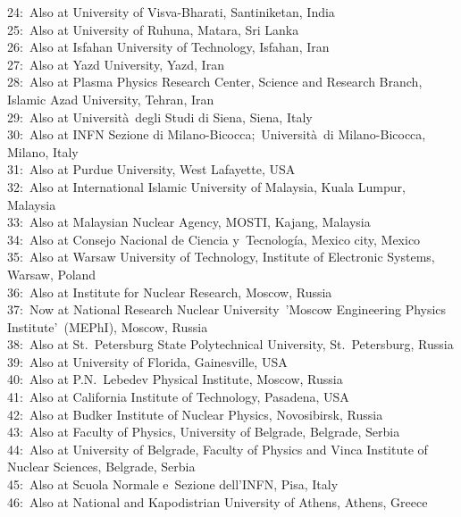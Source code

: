 24:~Also at University of Visva-Bharati, Santiniketan, India\\
25:~Also at University of Ruhuna, Matara, Sri Lanka\\
26:~Also at Isfahan University of Technology, Isfahan, Iran\\
27:~Also at Yazd University, Yazd, Iran\\
28:~Also at Plasma Physics Research Center, Science and Research Branch, Islamic Azad University, Tehran, Iran\\
29:~Also at Universit\`{a}~degli Studi di Siena, Siena, Italy\\
30:~Also at INFN Sezione di Milano-Bicocca;~Universit\`{a}~di Milano-Bicocca, Milano, Italy\\
31:~Also at Purdue University, West Lafayette, USA\\
32:~Also at International Islamic University of Malaysia, Kuala Lumpur, Malaysia\\
33:~Also at Malaysian Nuclear Agency, MOSTI, Kajang, Malaysia\\
34:~Also at Consejo Nacional de Ciencia y~Tecnolog\'{i}a, Mexico city, Mexico\\
35:~Also at Warsaw University of Technology, Institute of Electronic Systems, Warsaw, Poland\\
36:~Also at Institute for Nuclear Research, Moscow, Russia\\
37:~Now at National Research Nuclear University~'Moscow Engineering Physics Institute'~(MEPhI), Moscow, Russia\\
38:~Also at St.~Petersburg State Polytechnical University, St.~Petersburg, Russia\\
39:~Also at University of Florida, Gainesville, USA\\
40:~Also at P.N.~Lebedev Physical Institute, Moscow, Russia\\
41:~Also at California Institute of Technology, Pasadena, USA\\
42:~Also at Budker Institute of Nuclear Physics, Novosibirsk, Russia\\
43:~Also at Faculty of Physics, University of Belgrade, Belgrade, Serbia\\
44:~Also at University of Belgrade, Faculty of Physics and Vinca Institute of Nuclear Sciences, Belgrade, Serbia\\
45:~Also at Scuola Normale e~Sezione dell'INFN, Pisa, Italy\\
46:~Also at National and Kapodistrian University of Athens, Athens, Greece\\
